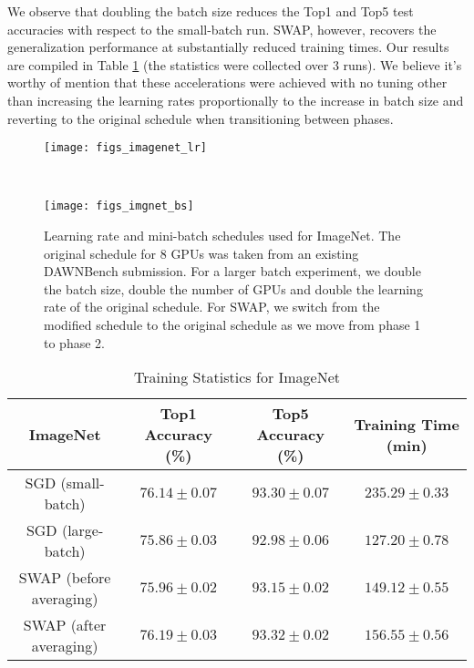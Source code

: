 \documentclass{article} %
\begin{document}
We observe that doubling the batch size reduces the Top1 and Top5 test
accuracies with respect to the small-batch run. SWAP, however, recovers the
generalization performance at substantially reduced training times. Our results
are compiled in Table \ref{table:imagenet} (the statistics were collected over
3 runs). We believe it's worthy of mention that these accelerations were
achieved with no tuning other than increasing the learning rates proportionally
to the increase in batch size and reverting to the original schedule when
transitioning between phases. 

\begin{figure}[h] 
\centering 
\begin{minipage}{0.42\textwidth} 
	\centering
	\texttt{[image: figs\_imagenet\_lr]}  
\label{fig:imgnet_lr} 
\end{minipage} ~ 
\begin{minipage}{0.42\textwidth}
	\centering 
\texttt{[image: figs\_imgnet\_bs]} 
\label{fig:imgnet_bs}
\end{minipage} 
\vspace{-0.1in}
\caption{\small
Learning rate and mini-batch schedules used for ImageNet.  
	The original schedule for 8 GPUs was taken from an existing DAWNBench submission.
	For a larger batch experiment, we double the batch size, double the number of GPUs and double the learning rate of the original schedule.
	For SWAP, we switch from the modified schedule to the original schedule as we move from phase 1 to phase 2.}
\label{fig:imgnet} 
\vspace{-0.1in}
\end{figure}

\begin{table}[h] \centering \begin{tabular}{cccc} 
\multicolumn{1}{c}{\bf ImageNet}  & 
\multicolumn{1}{c}{\bf Top1 Accuracy (\%)} &
\multicolumn{1}{c}{\bf Top5 Accuracy (\%)} &
\multicolumn{1}{c}{\bf Training Time (min)}\\ 
\hline 
SGD (small-batch) & $76.14\pm 0.07$ & $93.30 \pm 0.07$ & $235.29 \pm 0.33$\\ 
SGD (large-batch) & $75.86 \pm 0.03$ & $92.98 \pm 0.06$ & $127.20 \pm 0.78$ \\ 
SWAP (before averaging) & $75.96 \pm 0.02$ & $93.15 \pm 0.02$ & $149.12 \pm 0.55$\\
SWAP (after averaging) & $76.19 \pm 0.03$ & $93.32 \pm 0.02$ & $156.55 \pm 0.56$
\\ \hline 
\end{tabular} 
\caption{Training Statistics for ImageNet} 
\label{table:imagenet} 
\vspace{-0.1in}
\end{table}
\end{document}
